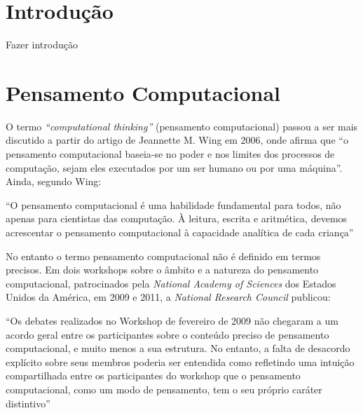 \documentclass[12pt, openright, a4paper, brazil, english, french, spanish, bibjustif, openany, oneside]{abntex2}
\begin{document}
\tableofcontents*
\cleardoublepage
\textual


\chapter*[Introdução]{Introdução}

Fazer introdução


\chapter{Pensamento Computacional}

O termo \textit{``computational thinking''} (pensamento computacional) passou a ser mais discutido a partir do artigo de Jeannette M. Wing em 2006, onde afirma que ``o pensamento computacional baseia-se no poder e nos limites dos processos de computação, sejam eles executados por um ser humano ou por uma máquina''\cite{wing}. Ainda, segundo Wing:

\begin{citacao}

``O pensamento computacional é uma habilidade fundamental para todos, não apenas para cientistas das computação. À leitura, escrita e aritmética, devemos acrescentar o pensamento computacional à capacidade analítica de cada criança'' \cite{wing}

\end{citacao}




No entanto o termo pensamento computacional não é definido em termos precisos. Em dois workshops sobre o âmbito e a natureza do pensamento computacional, patrocinados pela \textit{National Academy of Sciences} dos Estados Unidos da América, em 2009 e 2011, a \textit{National Research Council} publicou:

\begin{citacao}

``Os debates realizados no Workshop de fevereiro de 2009 não chegaram a um acordo geral entre os participantes sobre o conteúdo preciso de pensamento computacional, e muito menos a sua estrutura. No entanto, a falta de desacordo explícito sobre seus membros poderia ser entendida como refletindo uma intuição compartilhada entre os participantes do workshop que o pensamento computacional, como um modo de pensamento, tem o seu próprio caráter distintivo'' \cite{NRC}

\end{citacao}
\end{document}
